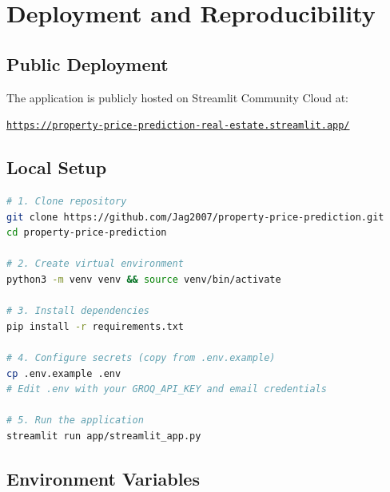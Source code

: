 \documentclass[12pt,a4paper]{article}
\begin{document}
\section{Deployment and Reproducibility}

\subsection{Public Deployment}

The application is publicly hosted on Streamlit Community Cloud at:
\begin{center}
\href{https://property-price-prediction-real-estate.streamlit.app/}{\texttt{https://property-price-prediction-real-estate.streamlit.app/}}
\end{center}

\subsection{Local Setup}

\begin{lstlisting}[language=bash, caption={Local installation and run commands}]
# 1. Clone repository
git clone https://github.com/Jag2007/property-price-prediction.git
cd property-price-prediction

# 2. Create virtual environment
python3 -m venv venv && source venv/bin/activate

# 3. Install dependencies
pip install -r requirements.txt

# 4. Configure secrets (copy from .env.example)
cp .env.example .env
# Edit .env with your GROQ_API_KEY and email credentials

# 5. Run the application
streamlit run app/streamlit_app.py
\end{lstlisting}

\subsection{Environment Variables}
\end{document}
